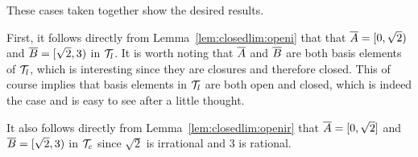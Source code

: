 {{    These cases taken together show the desired results.
  }

  \mainprob
  
  First, it follows directly from Lemma~\ref{lem:closedlim:openi} that that $\overline{A} = [0, \sqrt{2})$ and $\overline{B} = [\sqrt{2},3)$ in $\mathcal{T}_l$.
  It is worth noting that $\overline{A}$ and $\overline{B}$ are both basis elements of $\mathcal{T}_l$, which is interesting since they are closures and therefore closed.
  This of course implies that basis elements in $\mathcal{T}_l$ are both open and closed, which is indeed the case and is easy to see after a little thought.
  
  It also follows directly from Lemma~\ref{lem:closedlim:openir} that $\overline{A} = [0, \sqrt{2}]$ and $\overline{B} = [\sqrt{2}, 3)$ in $\mathcal{T}_c$ since $\sqrt{2}$ is irrational and $3$ is rational.
}

